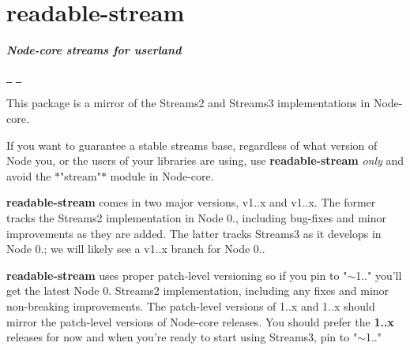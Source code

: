 \chapter{readable-\/stream}
\hypertarget{md__c_1_2_users_2_s_t_r_i_d_e_r_2source_2repos_2_internal_a_p_i_2_internal_a_p_i_2wwwroot_2lib_2b4a7c07a3da8b170f690b0e9bab9df63}{}\label{md__c_1_2_users_2_s_t_r_i_d_e_r_2source_2repos_2_internal_a_p_i_2_internal_a_p_i_2wwwroot_2lib_2b4a7c07a3da8b170f690b0e9bab9df63}
\label{md__c_1_2_users_2_s_t_r_i_d_e_r_2source_2repos_2_internal_a_p_i_2_internal_a_p_i_2wwwroot_2lib_2b4a7c07a3da8b170f690b0e9bab9df63_autotoc_md2166}%
%
 {\itshape {\bfseries{Node-\/core streams for userland}}}

\href{https://nodei.co/npm/readable-stream/}{\texttt{ }} \href{https://nodei.co/npm/readable-stream/}{\texttt{ }}

This package is a mirror of the Streams2 and Streams3 implementations in Node-\/core.

If you want to guarantee a stable streams base, regardless of what version of Node you, or the users of your libraries are using, use {\bfseries{readable-\/stream}} {\itshape only} and avoid the \texorpdfstring{$\ast$}{*}"{}stream"{}\texorpdfstring{$\ast$}{*} module in Node-\/core.

{\bfseries{readable-\/stream}} comes in two major versions, v1..\+x and v1..\+x. The former tracks the Streams2 implementation in Node 0., including bug-\/fixes and minor improvements as they are added. The latter tracks Streams3 as it develops in Node 0.; we will likely see a v1..\+x branch for Node 0..

{\bfseries{readable-\/stream}} uses proper patch-\/level versioning so if you pin to {\ttfamily "{}\texorpdfstring{$\sim$}{\string~}1.."{}} you’ll get the latest Node 0. Streams2 implementation, including any fixes and minor non-\/breaking improvements. The patch-\/level versions of 1..\+x and 1..\+x should mirror the patch-\/level versions of Node-\/core releases. You should prefer the {\bfseries{1..\+x}} releases for now and when you’re ready to start using Streams3, pin to {\ttfamily "{}\texorpdfstring{$\sim$}{\string~}1.."{}} 
